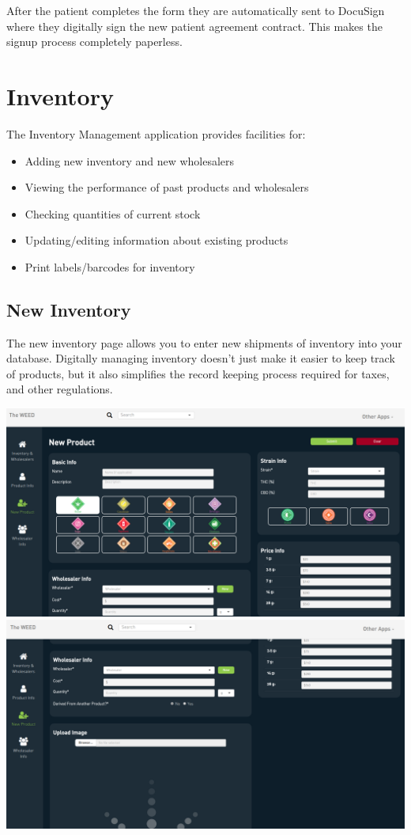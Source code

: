 \documentclass[]{book}
\theoremstyle{definition}
\theoremstyle{definition}
\theoremstyle{definition}
\theoremstyle{remark}
\begin{document}
After the patient completes the form they are automatically sent to
DocuSign where they digitally sign the new patient agreement contract.
This makes the signup process completely paperless.

\chapter{Inventory}\label{inventory}

The Inventory Management application provides facilities for:

\begin{itemize}
\item
  Adding new inventory and new wholesalers
\item
  Viewing the performance of past products and wholesalers
\item
  Checking quantities of current stock
\item
  Updating/editing information about existing products
\item
  Print labels/barcodes for inventory
\end{itemize}

\section{New Inventory}\label{new-inventory}

The new inventory page allows you to enter new shipments of inventory
into your database. Digitally managing inventory doesn't just make it
easier to keep track of products, but it also simplifies the record
keeping process required for taxes, and other regulations.

\includegraphics{images/newInv.png} \includegraphics{images/newInv2.png}
\end{document}
